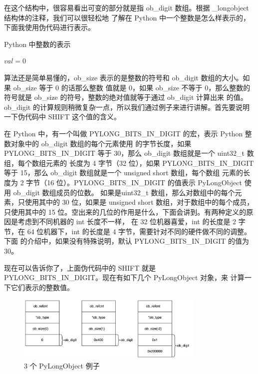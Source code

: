 在这个结构中，很容易看出可变的部分就是指 ob\_digit 数组。根据 \_longobject 结构体的注释，我们可以很轻松地
了解在 Python 中一个整数是怎么样表示的，下面我使用伪代码进行表示。

\begin{algorithm}
\caption{Python 中整数的表示}
$val = 0$\;
\end{algorithm}

算法还是简单易懂的，ob\_size 表示的是整数的符号和 ob\_digit 数组的大小。如果 ob\_size 等于 0 的话那么整数
值就是 0，如果 ob\_size 不等于 0，那么整数的符号就是 ob\_size 的符号，整数的绝对值就等于通过 ob\_digit 计算出来
的值。ob\_digit 的计算规则稍微复杂一点，所以我们通过例子来进行讲解。首先要说明一下伪代码中 SHIFT 这个值的含义。

在 Python 中，有一个叫做 PYLONG\_BITS\_IN\_DIGIT 的宏，表示 Python 整数对象中的 ob\_digit 数组的每个元素使用
的字节长度，如果 PYLONG\_BITS\_IN\_DIGIT 等于 30，那么 ob\_digit 数组就是一个 uint32\_t 数组，每个数组元素的
长度为 4 字节（32 位），如果 PYLONG\_BITS\_IN\_DIGIT 等于 15，那么 ob\_digit 数组就是一个 unsigned short 数组，每个数组
元素的长度为 2 字节（16 位）。PYLONG\_BITS\_IN\_DIGIT 的值表示 PyLongObject 使用 ob\_digit 数组成员的位数。
如果是uint32\_t 数组，那么对数组中的每个元素，只使用其中的 30 位，如果是 unsigned short 数组，对于数组中的每个成员，
只使用其中的 15 位。空出来的几位的作用是什么，下面会讲到。有两种定义的原因是考虑到不同机器的 int 长度不一样，
在 32 位机器喜爱，int 的长度是 2 字节，在 64 位机器下，int 的长度是 4 字节，需要针对不同的硬件做不同的调整。下面
的介绍中，如果没有特殊说明，默认 PYLONG\_BITS\_IN\_DIGIT 的值为 30。

现在可以告诉你了，上面伪代码中的 SHIFT 就是 PYLONG\_BITS\_IN\_DIGIT。现在有如下几个 PyLongObject 对象，来
计算一下它们表示的整数值。

\begin{figure}[htbp]
\centering
  \includegraphics[width=0.8\textwidth]{pictures/ch5_02.png}
  \caption{3 个 PyLongObject 例子 \label{fig:scatter}}
\end{figure}

